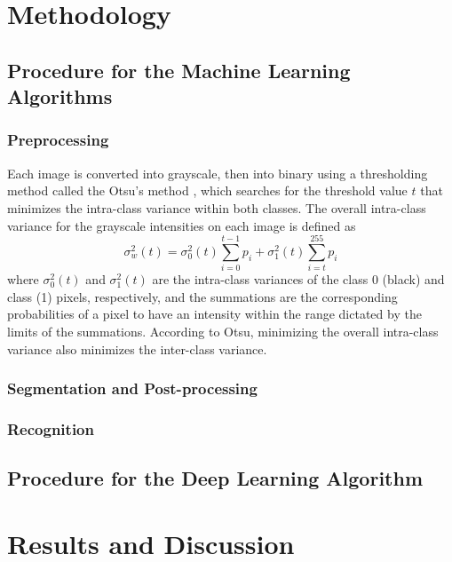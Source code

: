 \documentclass[conference,compsoc]{IEEEtran}
\begin{document}
\section{Methodology}
\subsection{Procedure for the Machine Learning Algorithms}
\subsubsection{Preprocessing}
Each image is converted into grayscale, then into binary using a thresholding method called the Otsu's method \cite{otsu79}, which searches for the threshold value $t$ that minimizes the intra-class variance within both classes. The overall intra-class variance for the grayscale intensities on each image is defined as
\[ \sigma^2_w(t) =  \sigma^2_0(t)\sum_{i=0}^{t-1}{p_i} +  \sigma^2_1(t)\sum_{i=t}^{255}{p_i} \]
where $\sigma^2_0(t)$ and $\sigma^2_1(t)$ are the intra-class variances of the class 0 (black) and class (1) pixels, respectively, and the summations are the corresponding probabilities of a pixel to have an intensity within the range dictated by the limits of the summations. According to Otsu, minimizing the overall intra-class variance also minimizes the inter-class variance.
\subsubsection{Segmentation and Post-processing}
\subsubsection{Recognition}
\subsection{Procedure for the Deep Learning Algorithm}
\section{Results and Discussion}
\end{document}
